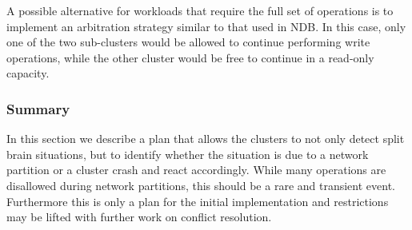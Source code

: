 A possible alternative for workloads that require the full set of operations is to implement an arbitration strategy similar to that used in NDB.
In this case, only one of the two sub-clusters would be allowed to continue performing write operations, while the other cluster would be free to continue in a read-only capacity.

\subsubsection{Summary}
In this section we describe a plan that allows the clusters to not only detect split brain situations, but to identify whether the situation is due to a network partition or a cluster crash and react accordingly.
While many operations are disallowed during network partitions, this should be a rare and transient event.
Furthermore this is only a plan for the initial implementation and restrictions may be lifted with further work on conflict resolution.

% 



